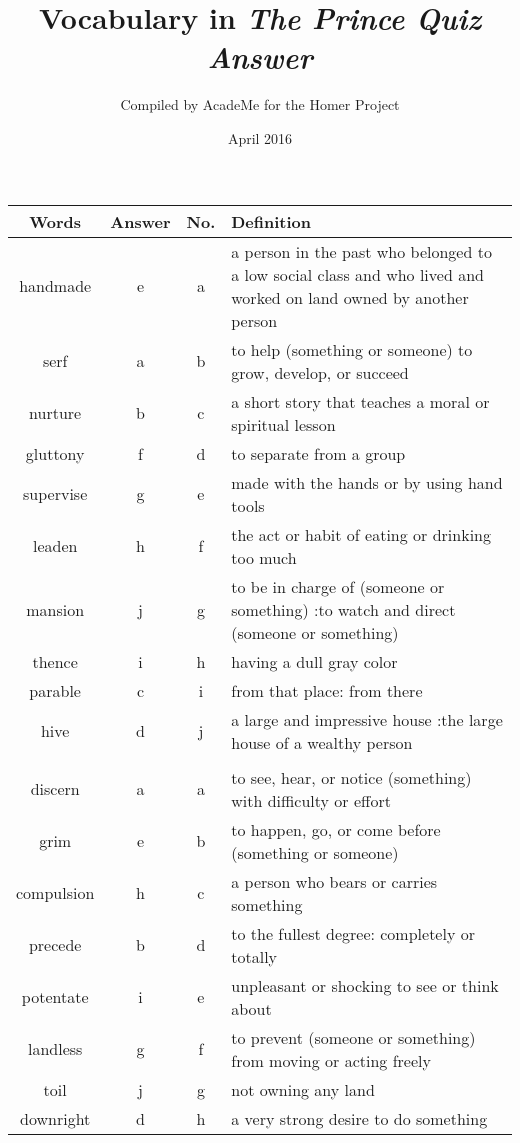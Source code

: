 \documentclass[a4paper]{article}
\title{Vocabulary in \textit{The Prince Quiz Answer}}
\author{Compiled by AcadeMe for the Homer Project}
\date{April 2016}
\begin{document}
\maketitle
\begin{center}
\begin{tabular}{|c|c|c|m{}|}
\hline
Words & Answer & No. & Definition \\
\hline
handmade & e & a &  a person in the past who belonged to a low social class and who lived and worked on land owned by another person \\
\hline
serf & a & b &  to help (something or someone) to grow, develop, or succeed \\
\hline
nurture & b & c &  a short story that teaches a moral or spiritual lesson \\
\hline
gluttony & f & d &  to separate from a group \\
\hline
supervise & g & e &  made with the hands or by using hand tools \\
\hline
leaden & h & f &  the act or habit of eating or drinking too much\\
\hline
mansion & j & g &  to be in charge of (someone or something) :to watch and direct (someone or something) \\
\hline
thence & i & h &  having a dull gray color \\
\hline
parable & c & i &  from that place: from there \\
\hline
hive & d & j &  a large and impressive house :the large house of a wealthy person \\
\hline
 & & & \\
\hline
discern & a & a &  to see, hear, or notice (something) with difficulty or effort \\
\hline
grim & e & b &  to happen, go, or come before (something or someone) \\
\hline
compulsion & h & c &  a person who bears or carries something \\
\hline
precede & b & d &  to the fullest degree: completely or totally \\
\hline
potentate & i & e &  unpleasant or shocking to see or think about \\
\hline
landless & g & f &  to prevent (someone or something) from moving or acting freely \\
\hline
toil & j & g &  not owning any land \\
\hline
downright & d & h &  a very strong desire to do something \\

\end{tabular}
\end{center}
\end{document}
